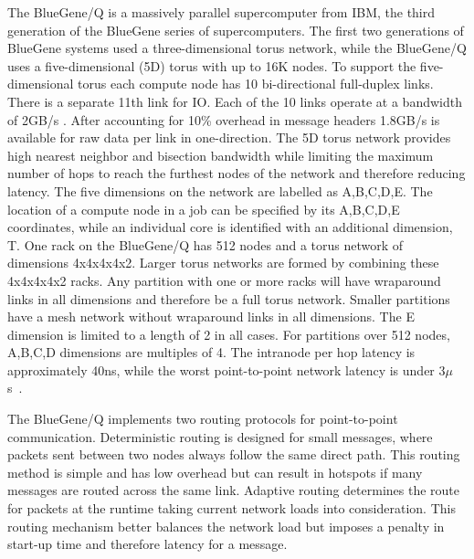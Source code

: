 \documentclass{acm_proc_article-sp}
\begin{document}
The BlueGene/Q is a massively parallel supercomputer from IBM, the third
generation of the BlueGene series of supercomputers.
The first two generations of BlueGene systems used a three-dimensional
torus network, while the BlueGene/Q uses a five-dimensional (5D) torus with up
to 16K nodes.  
To support the five-dimensional torus each compute node has 10 bi-directional full-duplex links. There is a separate 11th link for IO. Each of the 10 links
operate at a bandwidth of 2GB/s \cite{BGQ_RedBook_2013}. After accounting for 10\% overhead in message headers 1.8GB/s is available for raw data per link in one-direction.
The 5D torus network provides high nearest neighbor and bisection bandwidth
while limiting the maximum number of hops to reach the furthest nodes of
the network and therefore reducing latency. The five dimensions on the
network are labelled as
A,B,C,D,E.  The location of a compute node in a job can be specified
by its A,B,C,D,E coordinates, while an individual core is identified
with an additional dimension, T.  
One rack on the BlueGene/Q has 512 nodes and a torus network of
dimensions 4x4x4x4x2. 
Larger torus networks are formed by combining these 4x4x4x4x2 racks.
Any partition with one or more racks will have
wraparound links in all dimensions and therefore be a full torus network.
Smaller partitions have a mesh network without wraparound links in
all dimensions.  The E dimension is limited to a length
of 2 in all cases.  For partitions over 512 nodes,  A,B,C,D dimensions are multiples of 4.
The intranode per hop latency is approximately 40ns, 
while the worst point-to-point network latency is under 3$\mu$s~\cite{BGQ_Interconnect_2012}. 

The BlueGene/Q implements two routing protocols for point-to-point communication.
Deterministic routing is designed for small messages, where packets sent between two nodes always follow the same direct path.
This routing method is simple and has low overhead but can result in hotspots
if many messages are routed across the same link.
Adaptive routing determines the route for packets at the runtime taking current network loads into consideration.
This routing mechanism better balances the network load but imposes a
penalty in start-up time and therefore latency for a message.
\end{document}
